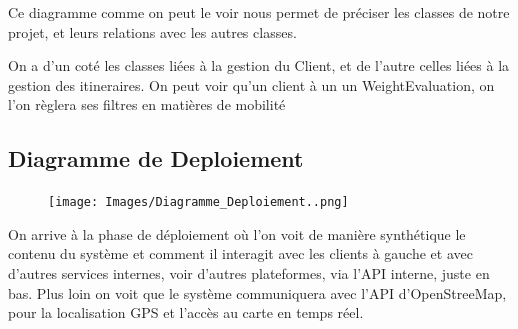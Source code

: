 Ce diagramme comme on peut le voir nous permet de préciser les classes de notre projet, et leurs relations avec les autres classes.

On a d'un coté les classes liées à la gestion du Client, et de l'autre celles liées à la gestion des itineraires. On peut voir qu'un client à un un WeightEvaluation, on l'on règlera ses filtres en matières de mobilité

\subsection{Diagramme de Deploiement}

\begin{figure}[h]
    \centering
    \texttt{[image: Images/Diagramme\_Deploiement..png]}
\end{figure}

On arrive à la phase de déploiement où l'on voit de manière synthétique le contenu du système et comment il interagit avec les clients à gauche et avec d'autres services internes, voir d'autres plateformes, via l'API interne, juste en bas. Plus loin on voit que le système communiquera avec l'API d'OpenStreeMap, pour la localisation GPS et l'accès au carte en temps réel.



